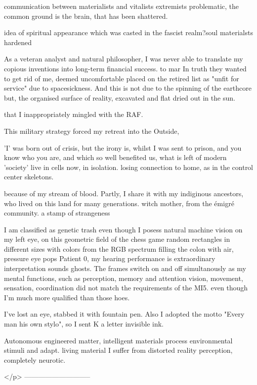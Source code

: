 \documentclass{article}
\begin{document}
communication between materialists and vitalists extremists problematic, 
the common ground is the brain, that has been shattered. 

idea of spiritual appearance which was casted in the fascist realm?soul
materialsts hardened


As a veteran analyst and natural philosopher, 
I was never able to translate my copious inventions into long-term
financial success. 
to mar
In truth they wanted to get rid of me, deemed uncomfortable
placed on the retired list as "unfit for service"
due to spacesickness. 
And this is not due to the spinning of the earthcore
but, 
the organised surface of reality, excavated and flat dried out in the sun.

that I inappropriately mingled with the RAF.

This military strategy forced my retreat into the Outside, 

'I' was born out of crisis, but the irony is, 
whilst I was sent to prison, and you know who you are, 
and which so well benefited us, what is left of modern 'society' live in cells now,
in isolation.
losing connection to home, as in the control center skeletons.

 
because of my stream of blood.
Partly, I share it with my indiginous ancestors, who lived on this land 
for many generations. 
witch mother, from the émigré community.
a stamp of strangeness




I am classified as genetic trash even though I posess natural
machine vision on my left eye, on this geometric field of the chess game
random rectangles in different sizes with colors from the RGB spectrum
filling the colon with air, pressure eye pops
Patient 0, 
my hearing performance is extraordinary
interpretation sounds ghosts.
The frames switch on and off
simultanously
as my mental functions, such as perception, memory and attention
vision, movement, sensation, coordination
did not match the requirements of the MI5.
even though I'm much more qualified than those hoes.

I've lost an eye, stabbed it
with fountain pen. 
Also I adopted the motto "Every man his own stylo", 
so I sent K a letter invisible ink. 



Autonomous engineered matter, intelligent materials
process environmental stimuli and adapt. 
living material
I suffer from distorted reality perception, completely neurotic. 


</p>
-----------------------------
\end{document}
